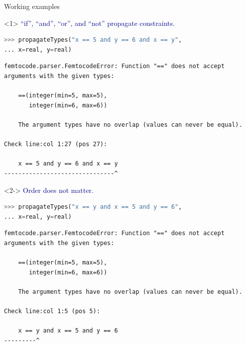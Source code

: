 \documentclass{beamer}
\begin{document}
\begin{frame}[fragile]{Working examples}
\vspace{0.5 cm}
\begin{onlyenv}<1>
\textcolor{darkblue}{``if'', ``and'', ``or'', and ``not'' propagate constraints.}
\begin{lstlisting}[language=python]
>>> propagateTypes("x == 5 and y == 6 and x == y",
... x=real, y=real)
\end{lstlisting}
\color{red}
\begin{lstlisting}[basicstyle=\ttfamily\scriptsize]
femtocode.parser.FemtocodeError: Function "==" does not accept arguments with the given types:

    ==(integer(min=5, max=5),
       integer(min=6, max=6))

    The argument types have no overlap (values can never be equal).

Check line:col 1:27 (pos 27):

    x == 5 and y == 6 and x == y
-------------------------------^
\end{lstlisting}
\end{onlyenv}
\begin{onlyenv}<2->
\textcolor{darkblue}{Order does not matter.}
\begin{lstlisting}[language=python]
>>> propagateTypes("x == y and x == 5 and y == 6",
... x=real, y=real)
\end{lstlisting}
\color{red}
\begin{lstlisting}[basicstyle=\ttfamily\scriptsize]
femtocode.parser.FemtocodeError: Function "==" does not accept arguments with the given types:

    ==(integer(min=5, max=5),
       integer(min=6, max=6))

    The argument types have no overlap (values can never be equal).

Check line:col 1:5 (pos 5):

    x == y and x == 5 and y == 6
---------^
\end{lstlisting}
\end{onlyenv}
\end{frame}
\end{document}
